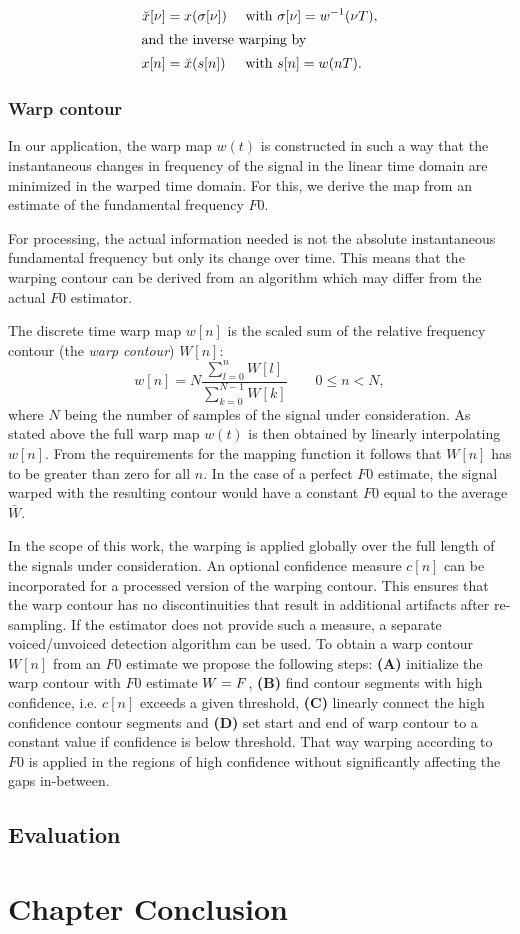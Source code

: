 \begin{align}
\breve{x}[\nu] &= x(\sigma[\nu]) & \textrm{ with } & \sigma[\nu] = w^{-1}(\nu T), \\
\intertext{and the inverse warping by}
x{}[n] &= \breve{x}(s[n]) & \textrm{ with } & s{}[n] = w(nT).
\end{align}

\subsubsection{Warp contour}
\label{subs:warp_contour}

In our application, the warp map $w(t)$ is constructed in such a way that the instantaneous changes in frequency of the signal in the linear time domain are minimized in the warped time domain. For this, we derive the map from an estimate of the fundamental frequency $F0$.

For processing, the actual information needed is not the absolute instantaneous fundamental frequency but only its change over time. This means that the warping contour can be derived from an algorithm which may differ from the actual $F0$ estimator.

The discrete time warp map $w[n]$ is the scaled sum of the relative
frequency contour (the \emph{warp contour}) $W[n]$:
\begin{equation}
w[n]=N \frac{\sum^n_{l=0}{W[l]}}{\sum^{N-1}_{k=0}{W[k]}}  \qquad 0\leq n<N,
\end{equation}
where $N$ being the number of samples of the signal under consideration.
As stated above the full warp map $w(t)$ is then obtained by linearly interpolating $w[n]$. From the requirements for the mapping function it follows that $W[n]$ has to be greater than zero for all $n$. In the case of a perfect $F0$ estimate, the signal warped with the resulting contour would have a constant $F0$ equal to the average $\bar{W}$.

In the scope of this work, the warping is applied globally over the full length of the signals under consideration. An optional confidence measure $c[n]$ can be incorporated for a processed version of the warping contour. This ensures that the warp contour has no discontinuities that result in additional artifacts after re-sampling. If the estimator does not provide such a measure, a separate voiced/unvoiced detection algorithm can be used. To obtain a warp contour $W[n]$ from an $F0$ estimate we propose the following steps: \textbf{(A)} initialize the warp contour with $F0$ estimate $W = {F}$, \textbf{(B)} find contour segments with high confidence, i.e. $c[n]$ exceeds a given threshold, \textbf{(C)} linearly connect the high confidence contour segments and \textbf{(D)} set start and end of warp contour to a constant value if confidence is below threshold. That way warping according to $F0$ is applied in the regions of high confidence without significantly affecting the gaps in-between.

\subsection{Evaluation}

\section{Chapter Conclusion}
